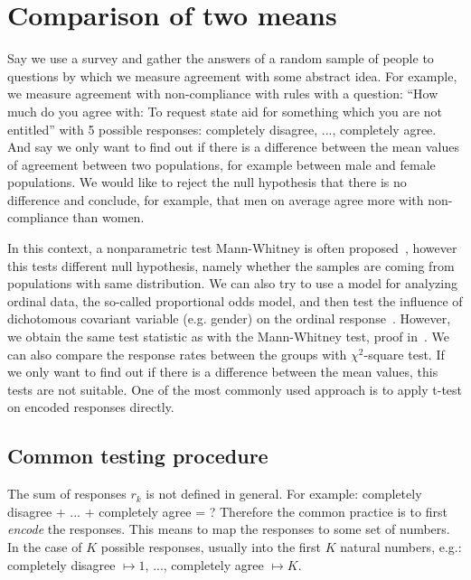 \documentclass[10pt]{article}
\begin{document}
\section{Comparison of two means} \label{sec: comparison-problem}
Say we use a survey and gather the answers of a random sample of people to questions by which we measure agreement with some abstract idea. For example, we measure agreement with non-compliance with rules with a question: ``How much do you agree with: To request state aid for something which you are not entitled'' with 5 possible responses: completely disagree, ..., completely agree. And say we only want to find out if there is a difference between the mean values of agreement between two populations, for example between male and female populations. We would like to reject the null hypothesis that there is no difference and conclude, for example, that men on average agree more with non-compliance than women.

In this context, a nonparametric test Mann-Whitney is often proposed~\cite{Winter}, however this tests different null hypothesis, namely whether the samples are coming from populations with same distribution. We can also try to use a model for analyzing ordinal data, the so-called proportional odds model, and then test the influence of dichotomous covariant variable (e.g. gender) on the ordinal response~\cite{McCullagh}. However, we obtain the same test statistic as with the Mann-Whitney test, proof in~\cite{Natarajan}. We can also compare the response rates between the groups with $\chi^{2}$-square test. If we only want to find out if there is a difference between the mean values, this tests are not suitable. One of the most commonly used approach is to apply t-test on encoded responses directly.

\subsection{Common testing procedure} \label{sec: fail_test_stat}
The sum of responses $r_{k}$ is not defined in general. For example: completely disagree + ... + completely agree = ? Therefore the common practice is to first {\it encode} the responses. This means to map the responses to some set of numbers. In the case of $K$ possible responses, usually into the first $K$ natural numbers, e.g.: completely disagree $\mapsto 1$, ..., completely agree $\mapsto K$. 
\end{document}
